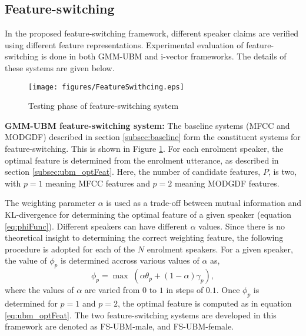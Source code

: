 \documentclass{article}
\begin{document}
	
\subsection{Feature-switching}
\label{subsec:featSwitch}

In the proposed feature-switching framework, different speaker
claims are verified using different feature representations. 
Experimental evaluation of feature-switching is done in both
GMM-UBM and i-vector frameworks. The details of these systems
are given below.

\begin{figure}[h]
\texttt{[image: figures/FeatureSwithcing.eps]}
\caption{Testing phase of feature-switching system}
\label{fig:systemArch2}
\end{figure}


\textbf{GMM-UBM feature-switching system:}
The baseline systems (MFCC and MODGDF) described in section
\ref{subsec:baseline} form the constituent systems for feature-switching. This
is shown in Figure \ref{fig:systemArch2}. For each enrolment speaker, the
optimal feature is determined from the enrolment utterance, as described in
section \ref{subsec:ubm_optFeat}. Here, the number of candidate features, $P$,
is two, with $p=1$ meaning MFCC features and $p=2$ meaning MODGDF features.

The weighting parameter $\alpha$ is used as a trade-off between mutual information and
KL-divergence for determining the optimal feature of a given speaker (equation
\ref{eq:phiFunc}). Different speakers can have different $\alpha$ values. Since
there is no theoretical insight to determining the correct weighting feature,
the following procedure is adopted for each of the $N$ enrolment speakers.
For a given speaker, the value of $\phi_p$ is determined accross various values
of $\alpha$ as, 
\begin{equation}
\phi_p = \max \; (\alpha \theta_p + (1-\alpha) \gamma_p),
\end{equation}
where the values of $\alpha$ are varied from $0$ to $1$ in steps of $0.1$. Once
$\phi_p$ is determined for $p=1$ and $p=2$, the optimal feature is computed as in equation
\ref{eq:ubm_optFeat}.
The two feature-switching systems are developed in this framework are denoted as
FS-UBM-male, and FS-UBM-female. 
\end{document}

